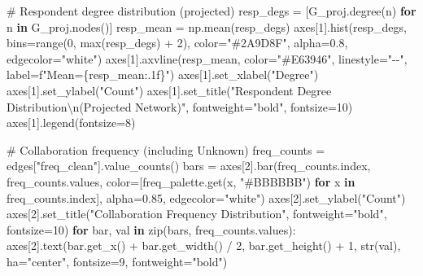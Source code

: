 \documentclass[
  letterpaper,
  DIV=11,
  numbers=noendperiod]{scrartcl}
\newenvironment{Shaded}{\begin{snugshade}}{\end{snugshade}}
\newcommand{\BuiltInTok}[1]{\textcolor[rgb]{0.00,0.23,0.31}{#1}}
\newcommand{\CharTok}[1]{\textcolor[rgb]{0.13,0.47,0.30}{#1}}
\newcommand{\CommentTok}[1]{\textcolor[rgb]{0.37,0.37,0.37}{#1}}
\newcommand{\ControlFlowTok}[1]{\textcolor[rgb]{0.00,0.23,0.31}{\textbf{#1}}}
\newcommand{\DecValTok}[1]{\textcolor[rgb]{0.68,0.00,0.00}{#1}}
\newcommand{\FloatTok}[1]{\textcolor[rgb]{0.68,0.00,0.00}{#1}}
\newcommand{\KeywordTok}[1]{\textcolor[rgb]{0.00,0.23,0.31}{\textbf{#1}}}
\newcommand{\NormalTok}[1]{\textcolor[rgb]{0.00,0.23,0.31}{#1}}
\newcommand{\OperatorTok}[1]{\textcolor[rgb]{0.37,0.37,0.37}{#1}}
\newcommand{\SpecialCharTok}[1]{\textcolor[rgb]{0.37,0.37,0.37}{#1}}
\newcommand{\SpecialStringTok}[1]{\textcolor[rgb]{0.13,0.47,0.30}{#1}}
\newcommand{\StringTok}[1]{\textcolor[rgb]{0.13,0.47,0.30}{#1}}
\begin{document}
\begin{Shaded}
\begin{Highlighting}[]
\CommentTok{\# Respondent degree distribution (projected)}
\NormalTok{resp\_degs }\OperatorTok{=}\NormalTok{ [G\_proj.degree(n) }\ControlFlowTok{for}\NormalTok{ n }\KeywordTok{in}\NormalTok{ G\_proj.nodes()]}
\NormalTok{resp\_mean }\OperatorTok{=}\NormalTok{ np.mean(resp\_degs)}
\NormalTok{axes[}\DecValTok{1}\NormalTok{].hist(resp\_degs, bins}\OperatorTok{=}\BuiltInTok{range}\NormalTok{(}\DecValTok{0}\NormalTok{, }\BuiltInTok{max}\NormalTok{(resp\_degs) }\OperatorTok{+} \DecValTok{2}\NormalTok{),}
\NormalTok{             color}\OperatorTok{=}\StringTok{"\#2A9D8F"}\NormalTok{, alpha}\OperatorTok{=}\FloatTok{0.8}\NormalTok{, edgecolor}\OperatorTok{=}\StringTok{"white"}\NormalTok{)}
\NormalTok{axes[}\DecValTok{1}\NormalTok{].axvline(resp\_mean, color}\OperatorTok{=}\StringTok{"\#E63946"}\NormalTok{, linestyle}\OperatorTok{=}\StringTok{"{-}{-}"}\NormalTok{,}
\NormalTok{                label}\OperatorTok{=}\SpecialStringTok{f"Mean=}\SpecialCharTok{\{}\NormalTok{resp\_mean}\SpecialCharTok{:.1f\}}\SpecialStringTok{"}\NormalTok{)}
\NormalTok{axes[}\DecValTok{1}\NormalTok{].set\_xlabel(}\StringTok{"Degree"}\NormalTok{)}
\NormalTok{axes[}\DecValTok{1}\NormalTok{].set\_ylabel(}\StringTok{"Count"}\NormalTok{)}
\NormalTok{axes[}\DecValTok{1}\NormalTok{].set\_title(}\StringTok{"Respondent Degree Distribution}\CharTok{\textbackslash{}n}\StringTok{(Projected Network)"}\NormalTok{,}
\NormalTok{                  fontweight}\OperatorTok{=}\StringTok{"bold"}\NormalTok{, fontsize}\OperatorTok{=}\DecValTok{10}\NormalTok{)}
\NormalTok{axes[}\DecValTok{1}\NormalTok{].legend(fontsize}\OperatorTok{=}\DecValTok{8}\NormalTok{)}

\CommentTok{\# Collaboration frequency (including Unknown)}
\NormalTok{freq\_counts }\OperatorTok{=}\NormalTok{ edges[}\StringTok{"freq\_clean"}\NormalTok{].value\_counts()}
\NormalTok{bars }\OperatorTok{=}\NormalTok{ axes[}\DecValTok{2}\NormalTok{].bar(freq\_counts.index, freq\_counts.values,}
\NormalTok{                   color}\OperatorTok{=}\NormalTok{[freq\_palette.get(x, }\StringTok{"\#BBBBBB"}\NormalTok{)}
                          \ControlFlowTok{for}\NormalTok{ x }\KeywordTok{in}\NormalTok{ freq\_counts.index],}
\NormalTok{                   alpha}\OperatorTok{=}\FloatTok{0.85}\NormalTok{, edgecolor}\OperatorTok{=}\StringTok{"white"}\NormalTok{)}
\NormalTok{axes[}\DecValTok{2}\NormalTok{].set\_ylabel(}\StringTok{"Count"}\NormalTok{)}
\NormalTok{axes[}\DecValTok{2}\NormalTok{].set\_title(}\StringTok{"Collaboration Frequency Distribution"}\NormalTok{,}
\NormalTok{                  fontweight}\OperatorTok{=}\StringTok{"bold"}\NormalTok{, fontsize}\OperatorTok{=}\DecValTok{10}\NormalTok{)}
\ControlFlowTok{for}\NormalTok{ bar, val }\KeywordTok{in} \BuiltInTok{zip}\NormalTok{(bars, freq\_counts.values):}
\NormalTok{    axes[}\DecValTok{2}\NormalTok{].text(bar.get\_x() }\OperatorTok{+}\NormalTok{ bar.get\_width() }\OperatorTok{/} \DecValTok{2}\NormalTok{,}
\NormalTok{                 bar.get\_height() }\OperatorTok{+} \DecValTok{1}\NormalTok{, }\BuiltInTok{str}\NormalTok{(val),}
\NormalTok{                 ha}\OperatorTok{=}\StringTok{"center"}\NormalTok{, fontsize}\OperatorTok{=}\DecValTok{9}\NormalTok{, fontweight}\OperatorTok{=}\StringTok{"bold"}\NormalTok{)}


\end{Highlighting}
\end{Shaded}
\end{document}
